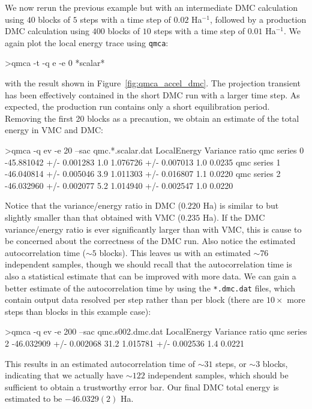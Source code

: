 We now rerun the previous example but with an intermediate DMC 
calculation using $40$ blocks of $5$ steps with a time step of 
$0.02$ Ha$^{-1}$, followed by a production DMC calculation 
using $400$ blocks of $10$ steps with a time step of $0.01$ Ha$^{-1}$.
We again plot the local energy trace using \texttt{qmca}:
\begin{shade}
>qmca -t -q e -e 0 *scalar* 
\end{shade}
\noindent
with the result shown in Figure~\ref{fig:qmca_accel_dmc}.
The projection transient has been effectively contained in the 
short DMC run with a larger time step.  As expected, the 
production run contains only a short equilibration period.
Removing the first 20 blocks as a precaution, we obtain an estimate 
of the total energy in VMC and DMC:
\begin{shade}
>qmca -q ev -e 20 --sac qmc.*.scalar.dat 
                            LocalEnergy               Variance           ratio 
qmc  series 0  -45.881042 +/- 0.001283    1.0   1.076726 +/- 0.007013    1.0   0.0235 
qmc  series 1  -46.040814 +/- 0.005046    3.9   1.011303 +/- 0.016807    1.1   0.0220 
qmc  series 2  -46.032960 +/- 0.002077    5.2   1.014940 +/- 0.002547    1.0   0.0220 
\end{shade}
\noindent
Notice that the variance/energy ratio in DMC ($0.220$ Ha) is similar to but 
slightly smaller than that obtained with VMC ($0.235$ Ha).  If the DMC 
variance/energy ratio is ever significantly larger than with VMC, this is 
cause to be concerned about the correctness of the DMC run.  Also notice 
the estimated autocorrelation time ($\sim 5$ blocks).  This leaves us with 
an estimated $\sim 76$ independent samples, though we should recall that 
the autocorrelation time is also a statistical estimate that can be improved 
with more data.  We can gain a better estimate of the autocorrelation 
time by using the \texttt{*.dmc.dat} files, which contain output data resolved 
per step rather than per block (there are $10\times$ more steps than blocks 
in this example case):
\begin{shade}
>qmca -q ev -e 200 --sac qmc.s002.dmc.dat 
                            LocalEnergy               Variance           ratio 
qmc  series 2  -46.032909 +/- 0.002068   31.2   1.015781 +/- 0.002536    1.4   0.0221 
\end{shade}
\noindent
This results in an estimated autocorrelation time of $\sim 31$ steps, or 
$\sim 3$ blocks, indicating that we actually have $\sim 122$ independent 
samples, which should be sufficient to obtain a trustworthy error bar.
Our final DMC total energy is estimated to be $-46.0329(2)$ Ha.

